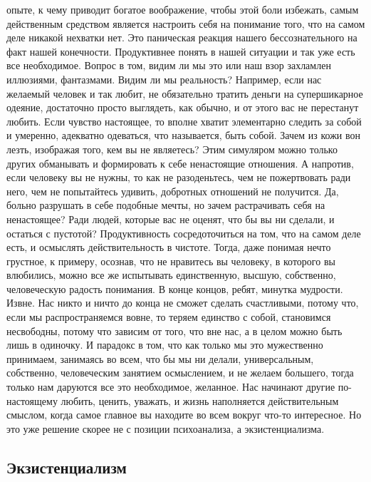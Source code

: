 опыте, к чему приводит богатое воображение, чтобы этой боли избежать, самым
действенным средством является настроить себя на понимание того, что на самом
деле никакой нехватки нет. Это паническая реакция нашего бессознательного на
факт нашей конечности. Продуктивнее понять в нашей ситуации и так уже есть все
необходимое. Вопрос в том, видим ли мы это или наш взор захламлен иллюзиями,
фантазмами. Видим ли мы реальность? Например, если нас желаемый человек и так
любит, не обязательно тратить деньги на супершикарное одеяние, достаточно просто
выглядеть, как обычно, и от этого вас не перестанут любить. Если чувство
настоящее, то вполне хватит элементарно следить за собой и умеренно, адекватно
одеваться, что называется, быть собой. Зачем из кожи вон лезть, изображая того,
кем вы не являетесь? Этим симуляром можно только других обманывать и формировать
к себе ненастоящие отношения. А напротив, если человеку вы не нужны, то как не
разоденьтесь, чем не пожертвовать ради него, чем не попытайтесь удивить,
добротных отношений не получится. Да, больно разрушать в себе подобные мечты, но
зачем растрачивать себя на ненастоящее? Ради людей, которые вас не оценят, что
бы вы ни сделали, и остаться с пустотой? Продуктивность сосредоточиться на том,
что на самом деле есть, и осмыслять действительность в чистоте. Тогда, даже
понимая нечто грустное, к примеру, осознав, что не нравитесь вы человеку, в
которого вы влюбились, можно все же испытывать единственную, высшую, собственно,
человеческую радость понимания. В конце концов, ребят, минутка мудрости. Извне.
Нас никто и ничто до конца не сможет сделать счастливыми, потому что, если мы
распространяемся вовне, то теряем единство с собой, становимся несвободны,
потому что зависим от того, что вне нас, а в целом можно быть лишь в одиночку. И
парадокс в том, что как только мы это мужественно принимаем, занимаясь во всем,
что бы мы ни делали, универсальным, собственно, человеческим занятием
осмыслением, и не желаем большего, тогда только нам даруются все это
необходимое, желанное. Нас начинают другие по-настоящему любить, ценить,
уважать, и жизнь наполняется действительным смыслом, когда самое главное вы
находите во всем вокруг что-то интересное. Но это уже решение скорее не с
позиции психоанализа, а экзистенциализма. 

\subsection{Экзистенциализм}

